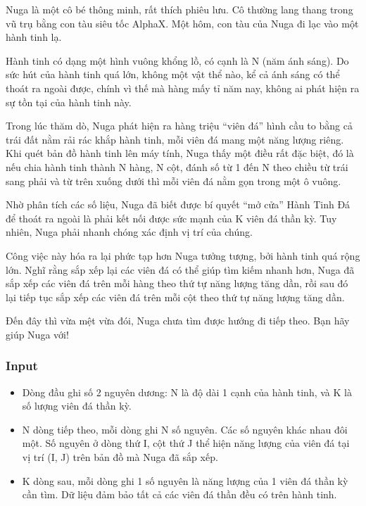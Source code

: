 



   Nuga là một cô bé thông minh, rất thích phiêu lưu. Cô thường lang thang trong vũ trụ bằng con tàu siêu tốc AlphaX. Một hôm, con tàu của Nuga đi lạc vào một hành tinh lạ.  

   Hành tinh có dạng một hình vuông khổng lồ, có cạnh là N (năm ánh sáng). Do sức hút của hành tinh quá lớn, không một vật thể nào, kể cả ánh sáng có thể thoát ra ngoài được, chính vì thế mà hàng mấy tỉ năm nay, không ai phát hiện ra sự tồn tại của hành tinh này.  

   Trong lúc thăm dò, Nuga phát hiện ra hàng triệu “viên đá” hình cầu to bằng cả trái đất nằm rải rác khắp hành tinh, mỗi viên đá mang một năng lượng riêng. Khi quét bản đồ hành tinh lên máy tính, Nuga thấy một điều rất đặc biệt, đó là nếu chia hành tinh thành N hàng, N cột, đánh số từ 1 đến N theo chiều từ trái sang phải và từ trên xuống dưới thì mỗi viên đá nằm gọn trong một ô vuông.  

   Nhờ phân tích các số liệu, Nuga đã biết được bí quyết “mở cửa” Hành Tinh Đá để thoát ra ngoài là phải kết nối được sức mạnh của K viên đá thần kỳ. Tuy nhiên, Nuga phải nhanh chóng xác định vị trí của chúng.  

   Công việc này hóa ra lại phức tạp hơn Nuga tưởng tượng, bởi hành tinh quá rộng lớn. Nghĩ rằng sắp xếp lại các viên đá có thể giúp tìm kiếm nhanh hơn, Nuga đã sắp xếp các viên đá trên mỗi hàng theo thứ tự năng lượng tăng dần, rồi sau đó lại tiếp tục sắp xếp các viên đá trên mỗi cột theo thứ tự năng lượng tăng dần.  

   Đến đây thì vừa mệt vừa đói, Nuga chưa tìm được hướng đi tiếp theo. Bạn hãy giúp Nuga với!  

\subsubsection{   Input  }
\begin{itemize}
	\item     Dòng đầu ghi số 2 nguyên dương: N là độ dài 1 cạnh của hành tinh, và K là số lượng viên đá thần kỳ.   
	\item     N dòng tiếp theo, mỗi dòng ghi N số nguyên. Các số nguyên khác nhau đôi một. Số nguyên ở dòng thứ I, cột thứ J thể hiện năng lượng của viên đá tại vị trí (I, J) trên bản đồ mà Nuga đã sắp xếp.   
	\item     K dòng sau, mỗi dòng ghi 1 số nguyên là năng lượng của 1 viên đá thần kỳ cần tìm. Dữ liệu đảm bảo tất cả các viên đá thần đều có trên hành tinh.   
\end{itemize}

